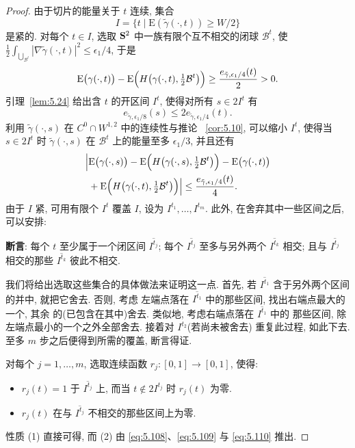 \begin{proof}
由于切片的能量关于 $t$ 连续, 集合
\begin{equation}
I=\{t\mid\mathrm{E}(\tilde{\gamma}(\cdot,t))\geq W/2\}
\label{eq:5.107}
\end{equation}
是紧的. 对每个 $t\in I$, 选取 $\mathbf{S}^2$ 中一族有限个互不相交的闭球
$\mathcal{B}^t$, 使
$\frac12\int_{\bigcup_{\mathcal{B}^t}}|\nabla\tilde{\gamma}(\cdot,t)|^2
\leq\epsilon_1/4$, 于是
\begin{equation}
\mathrm{E}\bigl(\gamma(\cdot,t)\bigr)
-\mathrm{E}\Bigl(H\bigl(\gamma(\cdot,t),\tfrac12\mathcal{B}^t\bigr)\Bigr)
\geq\frac{e_{\tilde{\gamma},\epsilon_1/4}(t)}{2}>0.
\label{eq:5.108}
\end{equation}
引理~\ref{lem:5.24} 给出含 $t$ 的开区间 $I^t$, 使得对所有 $s\in 2I^t$
有
\begin{equation}
e_{\tilde{\gamma},\epsilon_1/8}(s)\leq 2e_{\tilde{\gamma},\epsilon_1/4}(t).
\label{eq:5.109}
\end{equation}
利用 $\tilde{\gamma}(\cdot,s)$ 在 $C^0\cap W^{1,2}$ 中的连续性与推论
~\ref{cor:5.10}, 可以缩小 $I^t$, 使得当 $s\in 2I^t$ 时
$\tilde{\gamma}(\cdot,s)$ 在 $\mathcal{B}^t$ 上的能量至多 $\epsilon_1/3$,
并且还有
\begin{equation}
\begin{aligned}
\Bigl|&\mathrm{E}\bigl(\gamma(\cdot,s)\bigr)
-\mathrm{E}\Bigl(H\bigl(\gamma(\cdot,s),\tfrac12\mathcal{B}^t\bigr)\Bigr)
-\mathrm{E}\bigl(\gamma(\cdot,t)\bigr)\\
&+\mathrm{E}\Bigl(H\bigl(\gamma(\cdot,t),\tfrac12\mathcal{B}^t\bigr)\Bigr)
\Bigr|\leq\frac{e_{\tilde{\gamma},\epsilon_1/4}(t)}{4}.
\end{aligned}
\label{eq:5.110}
\end{equation}
由于 $I$ 紧, 可用有限个 $I^t$ 覆盖 $I$, 设为
$I^{t_1},\dots,I^{t_m}$. 此外, 在舍弃其中一些区间之后, 可以安排:

\medskip
\noindent\textbf{断言}: 每个 $t$ 至少属于一个闭区间
$\overline{I^{t_j}}$; 每个 $\overline{I^{t_j}}$ 至多与另外两个
$\overline{I^{t_k}}$ 相交; 且与 $\overline{I^{t_j}}$ 相交的那些
$\overline{I^{t_k}}$ 彼此不相交.

\medskip
我们将给出选取这些集合的具体做法来证明这一点. 首先, 若
$\overline{I^{t_1}}$ 含于另外两个区间的并中, 就把它舍去. 否则, 考虑
左端点落在 $\overline{I^{t_1}}$ 中的那些区间, 找出右端点最大的一个, 其余
的(已包含在其中)舍去. 类似地, 考虑右端点落在 $\overline{I^{t_1}}$ 中的
那些区间, 除左端点最小的一个之外全部舍去. 接着对 $I^{t_2}$(若尚未被舍去)
重复此过程, 如此下去. 至多 $m$ 步之后便得到所需的覆盖, 断言得证.

对每个 $j=1,\dots,m$, 选取连续函数 $r_j:[0,1]\to[0,1]$, 使得:

\begin{itemize}[leftmargin=1.8em,itemsep=1pt,topsep=2pt]
\item $r_j(t)=1$ 于 $\overline{I^{t_j}}$ 上, 而当
      $t\notin 2I^{t_j}$ 时 $r_j(t)$ 为零.
\item $r_j(t)$ 在与 $\overline{I^{t_j}}$ 不相交的那些区间上为零.
\end{itemize}

性质 (1) 直接可得, 而 (2) 由 \eqref{eq:5.108}、\eqref{eq:5.109} 与
\eqref{eq:5.110} 推出.
\end{proof}

